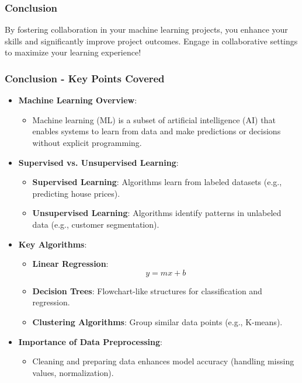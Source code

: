 \documentclass[aspectratio=169]{beamer}
\begin{document}
\begin{frame}
    \frametitle{Conclusion}
    By fostering collaboration in your machine learning projects, you enhance your skills and significantly improve project outcomes. Engage in collaborative settings to maximize your learning experience!
\end{frame}

\begin{frame}[fragile]
    \frametitle{Conclusion - Key Points Covered}
    \begin{itemize}
        \item \textbf{Machine Learning Overview}:
        \begin{itemize}
            \item Machine learning (ML) is a subset of artificial intelligence (AI) that enables systems to learn from data and make predictions or decisions without explicit programming.
        \end{itemize}
        
        \item \textbf{Supervised vs. Unsupervised Learning}:
        \begin{itemize}
            \item \textbf{Supervised Learning}: Algorithms learn from labeled datasets (e.g., predicting house prices).
            \item \textbf{Unsupervised Learning}: Algorithms identify patterns in unlabeled data (e.g., customer segmentation).
        \end{itemize}

        \item \textbf{Key Algorithms}:
        \begin{itemize}
            \item \textbf{Linear Regression}:
            \begin{equation*}
                y = mx + b
            \end{equation*}
            \item \textbf{Decision Trees}: Flowchart-like structures for classification and regression.
            \item \textbf{Clustering Algorithms}: Group similar data points (e.g., K-means).
        \end{itemize}

        \item \textbf{Importance of Data Preprocessing}:
        \begin{itemize}
            \item Cleaning and preparing data enhances model accuracy (handling missing values, normalization).
        \end{itemize}
    \end{itemize}
\end{frame}
\end{document}
